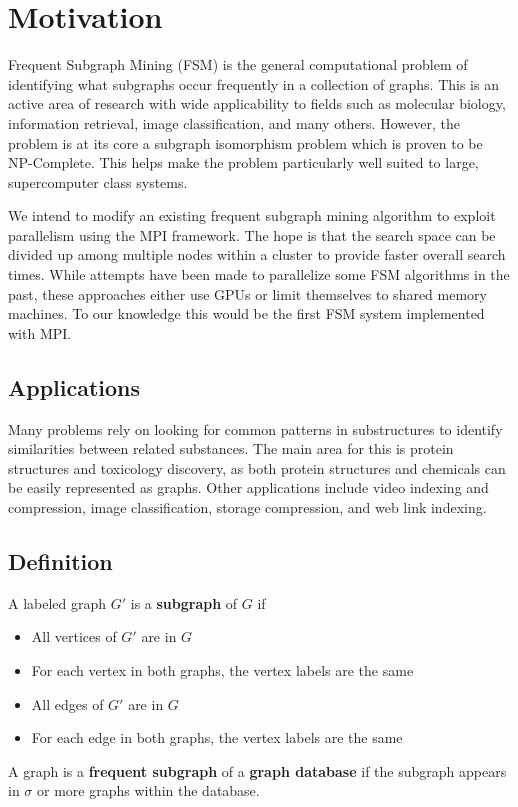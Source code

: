 \section{Motivation}
\label{sec:motivation}

Frequent Subgraph Mining (FSM) is the general computational problem of 
identifying what subgraphs occur frequently in a collection of graphs.  This 
is an active area of research with wide applicability to fields such as 
molecular biology, information retrieval, image classification, and many 
others.  However, the problem is at its core a subgraph isomorphism problem
which is proven to be NP-Complete\cite{cook1971complexity}.  This helps make
the problem particularly well suited to large, supercomputer class systems.

We intend to modify an existing frequent subgraph mining algorithm to exploit
parallelism using the MPI framework. The hope is that the search space can
be divided up among multiple nodes within a cluster to provide faster overall
search times.  While attempts have been made to parallelize some FSM 
algorithms in the past\cite{buehrer2005parallel,gspancuda}, these 
approaches either use GPUs or limit themselves to shared memory machines. 
To our knowledge this would be the first FSM system implemented with MPI.

\subsection{Applications}
\label{subsec:applications}

Many problems rely on looking for common patterns in substructures to 
identify similarities between related substances.  The main area 
for this is protein structures and toxicology discovery, as both 
protein structures\cite{substructures} and chemicals\cite{toxic} can be easily represented as 
graphs. Other applications include video indexing and compression\cite{videosub}, 
image classification\cite{de2012polynomial}\cite{plagram}, storage compression\cite{stored}, and web link 
indexing\cite{freqtrees}\cite{webgraphs}.

\subsection{Definition}
\label{subsec:complexity}

A labeled graph $G'$ is a {\bf subgraph} of $G$ if
\begin{itemize}
	\item{All vertices of $G'$ are in $G$}
	\item{For each vertex in both graphs, the vertex labels are the same}
	\item{All edges of $G'$ are in $G$ }
	\item{For each edge in both graphs, the vertex labels are the same}
\end{itemize}

A graph is a {\bf frequent subgraph} of a {\bf graph database} if the 
subgraph appears in $\sigma$ or more graphs within the database.


